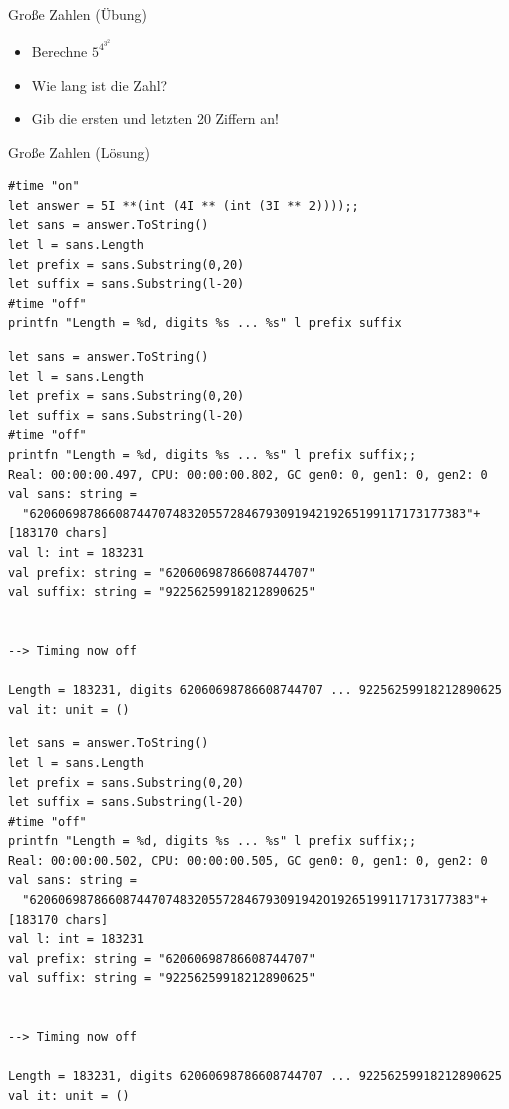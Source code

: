 \documentclass[t]{beamer}
\begin{document}
\begin{frame}[label={sec:orgb28a0da}]{Große Zahlen (Übung)}
\begin{itemize}
\item Berechne \(5^{4^{3^2}}\)
\item Wie lang ist die Zahl?
\item Gib die ersten und letzten 20 Ziffern an!
\end{itemize}
\end{frame}

\begin{frame}[label={sec:org723725f},fragile]{Große Zahlen (Lösung)}
 \begin{verbatim}
#time "on"
let answer = 5I **(int (4I ** (int (3I ** 2))));;
let sans = answer.ToString()
let l = sans.Length
let prefix = sans.Substring(0,20)
let suffix = sans.Substring(l-20)
#time "off"
printfn "Length = %d, digits %s ... %s" l prefix suffix
\end{verbatim}

\begin{verbatim}
let sans = answer.ToString()
let l = sans.Length
let prefix = sans.Substring(0,20)
let suffix = sans.Substring(l-20)
#time "off"
printfn "Length = %d, digits %s ... %s" l prefix suffix;;
Real: 00:00:00.497, CPU: 00:00:00.802, GC gen0: 0, gen1: 0, gen2: 0
val sans: string =
  "6206069878660874470748320557284679309194219265199117173177383"+[183170 chars]
val l: int = 183231
val prefix: string = "62060698786608744707"
val suffix: string = "92256259918212890625"


--> Timing now off

Length = 183231, digits 62060698786608744707 ... 92256259918212890625
val it: unit = ()
\end{verbatim}

\scriptsize
\begin{verbatim}
let sans = answer.ToString()
let l = sans.Length
let prefix = sans.Substring(0,20)
let suffix = sans.Substring(l-20)
#time "off"
printfn "Length = %d, digits %s ... %s" l prefix suffix;;
Real: 00:00:00.502, CPU: 00:00:00.505, GC gen0: 0, gen1: 0, gen2: 0
val sans: string =
  "62060698786608744707483205572846793091942O19265199117173177383"+[183170 chars]
val l: int = 183231
val prefix: string = "62060698786608744707"
val suffix: string = "92256259918212890625"


--> Timing now off

Length = 183231, digits 62060698786608744707 ... 92256259918212890625
val it: unit = ()
\end{verbatim}
\end{frame}
\end{document}
